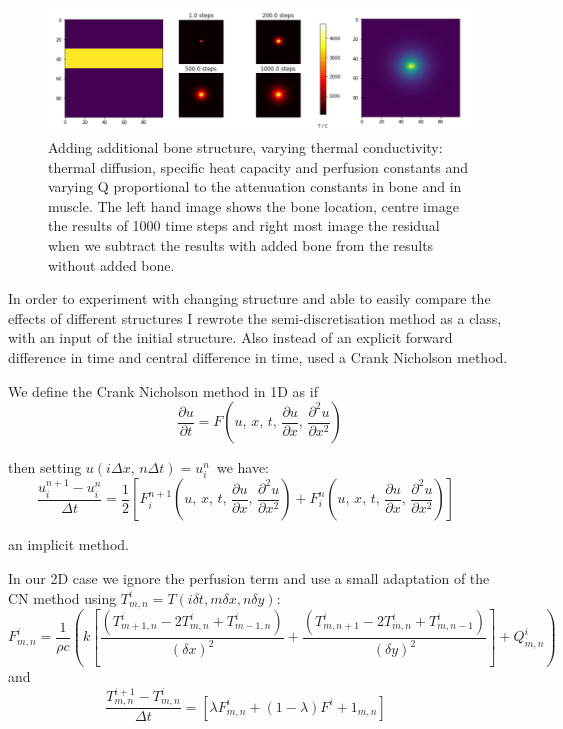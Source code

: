 \documentclass[11pt]{article} %
\begin{document}
 \begin{figure}
 	\centering
 	\includegraphics[width=\linewidth]{"Report_images/bone with changing Q"}
 	\caption{Adding additional bone structure, varying thermal conductivity: thermal diffusion, specific heat capacity and perfusion constants and varying Q proportional to the attenuation constants in bone and in muscle. The left hand image shows the bone location, centre image the results of 1000 time steps and right most image the residual when we subtract the results with added bone from the results without added bone. }
 	\label{fig:bone-with-changing-q}
 \end{figure}
 


In order to experiment with changing structure and able to easily compare the effects of different structures I rewrote the semi-discretisation method as a class, with an input of the initial structure. Also instead of an explicit forward difference in time and central difference in time, used a Crank Nicholson method. 

We define the Crank Nicholson method in 1D as if $$ \frac{\partial u}{\partial t} = F\left(u,\, x,\, t,\, \frac{\partial u}{\partial x},\, \frac{\partial^2 u}{\partial x^2}\right)$$

then setting $u(i \Delta x,\, n \Delta t) = u_{i}^{n}\,$ we have: $$ \frac{u_{i}^{n + 1} - u_{i}^{n}}{\Delta t} = 
\frac{1}{2}\left[
F_{i}^{n + 1}\left(u,\, x,\, t,\, \frac{\partial u}{\partial x},\, \frac{\partial^2 u}{\partial x^2}\right) + 
F_{i}^{n}\left(u,\, x,\, t,\, \frac{\partial u}{\partial x},\, \frac{\partial^2 u}{\partial x^2}\right)
\right] \qquad $$

an implicit method. 

In our 2D case we ignore the perfusion term and use a small adaptation of the CN method using $T^i_{m,n}= T(i\delta t, m\delta x, n\delta y)$: $$F^i_{m,n} = \frac{1}{\rho c} \left( k\left[  \frac{(T^i_{m+1,n}-2T^i_{m,n}+T^i_{m-1,n})}{(\delta x)^2}+\frac{(T^i_{m,n+1}-2T^i_{m,n}+T^i_{m,n-1})}{(\delta y)^2}\right] +Q^i_{m,n}\right) $$
and \begin{equation}
\frac{T_{m,n}^{i + 1} - T_{m,n}^{i}}{\Delta t} = 
\left[
\lambda F^{i}_{m,n}+(1-\lambda)F^{i}+1_{m,n} 
\right] \qquad \label{method}
\end{equation} 
\end{document}
